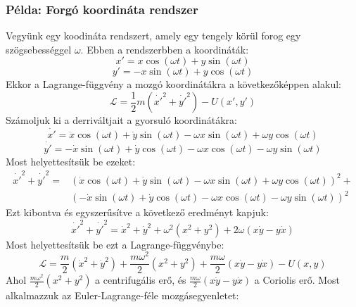 \documentclass[a4paper,12pt]{article}
\begin{document}
\subsubsection*{Példa: Forgó koordináta rendszer}
Vegyünk egy koodináta rendszert, amely egy tengely körül forog egy szögsebességgel $\omega$. Ebben a rendszerbben a koordináták:
\begin{equation}
    x' = x \cos(\omega t) + y \sin(\omega t)
\end{equation}
\begin{equation}
    y' = -x \sin(\omega t) + y \cos(\omega t)
\end{equation}
Ekkor a Lagrange-függvény a mozgó koordinátákra a következőképpen alakul:
\begin{equation}
    \mathcal{L} = \frac{1}{2}m(\dot{x'}^2 + \dot{y'}^2) - U(x', y')
\end{equation}
Számoljuk ki a derriváltjait a gyorsuló koordinátákra:
\begin{equation}
    \dot{x'} = \dot{x} \cos(\omega t) + \dot{y} \sin(\omega t) - \omega x \sin(\omega t) + \omega y \cos(\omega t)
\end{equation}
\begin{equation}
    \dot{y'} = -\dot{x} \sin(\omega t) + \dot{y} \cos(\omega t) - \omega x \cos(\omega t) - \omega y \sin(\omega t)
\end{equation}
Most helyettesítsük be ezeket:
\begin{equation}
    \begin{aligned}
        \dot{x'}^2 + \dot{y'}^2 = & (\dot{x} \cos(\omega t) + \dot{y} \sin(\omega t) - \omega x \sin(\omega t) + \omega y \cos(\omega t))^2 + \\
        & (-\dot{x} \sin(\omega t) + \dot{y} \cos(\omega t) - \omega x \cos(\omega t) - \omega y \sin(\omega t))^2
    \end{aligned}
\end{equation}
Ezt kibontva és egyszerűsítve a következő eredményt kapjuk:
\begin{equation}
    \dot{x'}^2 + \dot{y'}^2 = \dot{x}^2 + \dot{y}^2 + \omega^2 (x^2 + y^2) + 2\omega (x \dot{y} - y \dot{x})
\end{equation}
Most helyettesítsük be ezt a Lagrange-függvénybe:
\begin{equation}
    \mathcal{L} = \frac{m}{2}(\dot{x}^2 + \dot{y}^2) + \frac{m\omega^2}{2}(x^2 + y^2) + \frac{m\omega}{2}(x \dot{y} - y \dot{x}) - U(x, y)
\end{equation}
Ahol $\frac{m\omega^2}{2}(x^2 + y^2)$ a centrifugális erő, és $\frac{m\omega}{2}(x \dot{y} - y \dot{x})$ a Coriolis erő. Most alkalmazzuk az Euler-Lagrange-féle mozgásegyenletet:
\end{document}
